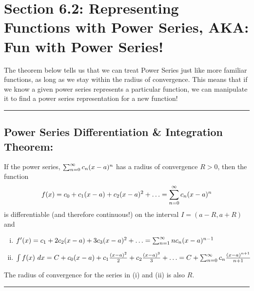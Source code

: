 


\setlength{\columnseprule}{.4pt}
\setlength{\columnsep}{3em}


\section*{Section 6.2: Representing Functions with Power Series, AKA: Fun with Power Series!}
The theorem below tells us that we can treat Power Series just like more familiar functions, as long as we stay within the radius of convergence.
This means that if we know a given power series represents a particular function, we can manipulate it to find a power series representation for a new function!\\



\hrule
\vspace*{.2in}

\subsection*{Power Series Differentiation \& Integration Theorem:}
If the power series, \(\sum_{n=0}^\infty c_n (x-a)^n\) has a radius of convergence \(R>0\), then the function
\[
f(x) = c_0 + c_1(x-a) + c_2(x-a)^2 + \ldots = \sum_{n=0}^\infty c_n (x-a)^n
\]
is differentiable (and therefore continuous!) on the interval \(I=(a-R, a+R)\) and
 \begin{enumerate}[(i)] 
 \item \(
f'(x) = c_1 + 2c_2(x-a) + 3c_3(x-a)^2 + \ldots = \sum_{n=1}^\infty n c_n (x-a)^{n-1}
\)
 \item \(
\int f(x)\ dx = C + c_0(x-a) + c_1\frac{(x-a)^2}{2} + c_2\frac{(x-a)^3}{3} + \ldots = C+\sum_{n=0}^\infty c_n \frac{(x-a)^{n+1}}{n+1}
\)
 \end{enumerate}
The radius of convergence for the series in (i) and (ii) is also \(R\).\\


\hrule
\vspace*{.2in}


